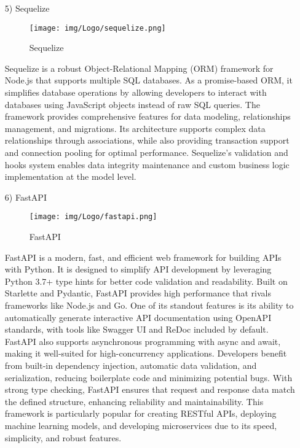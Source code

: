 \documentclass[conference]{IEEEtran}
\begin{document}
\begin{enumerate}
\begin{itemize}
        \vspace{1em}

        \item [5)] Sequelize\par
        \vspace{0.3em}
        \begin{figure}[h]
        \centering
        \texttt{[image: img/Logo/sequelize.png]}
        \centering
        \caption{Sequelize} 
        \end{figure}\par
        \vspace{0.3em}
        Sequelize is a robust Object-Relational Mapping (ORM) framework for Node.js that supports multiple SQL databases. As a promise-based ORM, it simplifies database operations by allowing developers to interact with databases using JavaScript objects instead of raw SQL queries. The framework provides comprehensive features for data modeling, relationships management, and migrations. Its architecture supports complex data relationships through associations, while also providing transaction support and connection pooling for optimal performance. Sequelize's validation and hooks system enables data integrity maintenance and custom business logic implementation at the model level.

        \vspace{1em}

        \item [6)] FastAPI\par
        \vspace{0.3em}
        \begin{figure}[h]
        \centering
        \texttt{[image: img/Logo/fastapi.png]}
        \centering
        \caption{FastAPI} 
        \end{figure}\par
        \vspace{0.3em}
        FastAPI is a modern, fast, and efficient web framework for building APIs with Python. It is designed to simplify API development by leveraging Python 3.7+ type hints for better code validation and readability. Built on Starlette and Pydantic, FastAPI provides high performance that rivals frameworks like Node.js and Go. One of its standout features is its ability to automatically generate interactive API documentation using OpenAPI standards, with tools like Swagger UI and ReDoc included by default. FastAPI also supports asynchronous programming with async and await, making it well-suited for high-concurrency applications. Developers benefit from built-in dependency injection, automatic data validation, and serialization, reducing boilerplate code and minimizing potential bugs. With strong type checking, FastAPI ensures that request and response data match the defined structure, enhancing reliability and maintainability. This framework is particularly popular for creating RESTful APIs, deploying machine learning models, and developing microservices due to its speed, simplicity, and robust features.


\end{itemize}
\end{enumerate}
\end{document}
